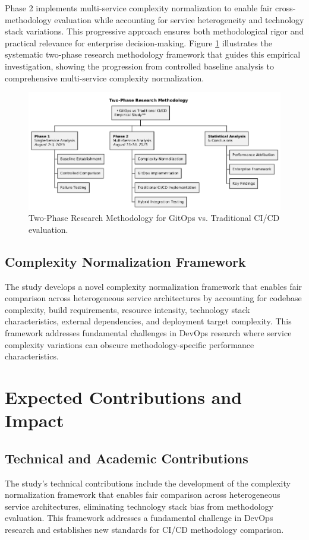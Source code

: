 Phase 2 implements multi-service complexity normalization to enable fair cross-methodology evaluation while accounting for service heterogeneity and technology stack variations. This progressive approach ensures both methodological rigor and practical relevance for enterprise decision-making.
Figure \ref{fig:research_methodology} illustrates the systematic two-phase research methodology framework that guides this empirical investigation, showing the progression from controlled baseline analysis to comprehensive multi-service complexity normalization.

\begin{figure}[H]
\centering
\includegraphics[width=\textwidth]{figures/research-methodology.png}
\caption{Two-Phase Research Methodology for GitOps vs. Traditional CI/CD evaluation.}
\label{fig:research_methodology}
\end{figure}

\subsection{Complexity Normalization Framework}
The study develops a novel complexity normalization framework that enables fair comparison across heterogeneous service architectures by accounting for codebase complexity, build requirements, resource intensity, technology stack characteristics, external dependencies, and deployment target complexity. This framework addresses fundamental challenges in DevOps research where service complexity variations can obscure methodology-specific performance characteristics.

\section{Expected Contributions and Impact}

\subsection{Technical and Academic Contributions}
The study's technical contributions include the development of the complexity normalization framework that enables fair comparison across heterogeneous service architectures, eliminating technology stack bias from methodology evaluation. This framework addresses a fundamental challenge in DevOps research and establishes new standards for CI/CD methodology comparison.

